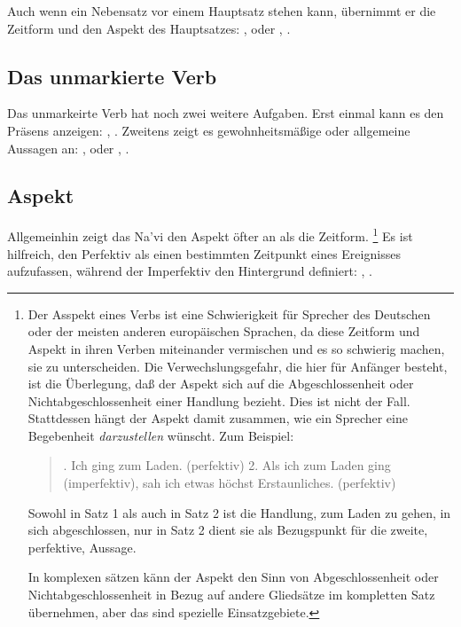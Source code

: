 \subsubsection{} Auch wenn ein Nebensatz vor einem Hauptsatz stehen kann, \"ubernimmt er
die Zeitform und den Aspekt des Hauptsatzes: ,  oder , .

\subsection{Das unmarkierte Verb} Das unmarkeirte Verb hat noch zwei weitere Aufgaben.
Erst einmal kann es den Pr\"asens anzeigen: , .
Zweitens zeigt es gewohnheitsm\"a\ss{}ige oder allgemeine Aussagen an: ,  oder ,
.

\subsection{Aspekt} Allgemeinhin zeigt das Na’vi den Aspekt \"ofter an als die Zeitform.
\footnote{Der Asspekt eines Verbs ist eine Schwierigkeit f\"ur Sprecher des Deutschen
oder der meisten anderen europ\"aischen Sprachen, da diese Zeitform und Aspekt in ihren
Verben miteinander vermischen und es so schwierig machen, sie zu unterscheiden. Die
Verwechslungsgefahr, die hier f\"ur Anf\"anger besteht, ist die \"Uberlegung, da\ss{}
der Aspekt sich auf die Abgeschlossenheit oder Nichtabgeschlossenheit einer Handlung
bezieht. Dies ist nicht der Fall. Stattdessen h\"angt der Aspekt damit zusammen, wie ein
Sprecher eine Begebenheit \textit{darzustellen} w\"unscht. Zum Beispiel:

\begin{quotation}
. Ich ging zum Laden. (perfektiv)
2. Als ich zum Laden ging (imperfektiv), sah ich etwas h\"ochst Erstaunliches. (perfektiv)
\end{quotation}
Sowohl in Satz 1 als auch in Satz 2 ist die Handlung, zum Laden zu gehen, in sich
abgeschlossen, nur in Satz 2 dient sie als Bezugspunkt f\"ur die zweite, perfektive,
Aussage.

In komplexen s\"atzen k\"ann der Aspekt den Sinn von Abgeschlossenheit oder
Nichtabgeschlossenheit in Bezug auf andere Glieds\"atze im kompletten Satz
\"ubernehmen, aber das sind spezielle Einsatzgebiete.}
Es ist hilfreich, den Perfektiv als einen bestimmten Zeitpunkt eines Ereignisses
aufzufassen, w\"ahrend der Imperfektiv den Hintergrund definiert: , .

